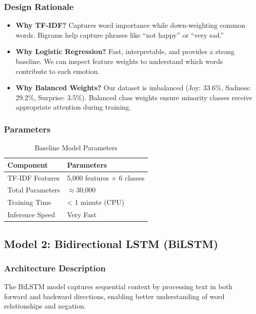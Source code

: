 \documentclass[12pt,a4paper]{article}
\begin{document}
\subsubsection{Design Rationale}
\begin{itemize}
    \item \textbf{Why TF-IDF?} Captures word importance while down-weighting common words. Bigrams help capture phrases like ``not happy'' or ``very sad.''
    
    \item \textbf{Why Logistic Regression?} Fast, interpretable, and provides a strong baseline. We can inspect feature weights to understand which words contribute to each emotion.
    
    \item \textbf{Why Balanced Weights?} Our dataset is imbalanced (Joy: 33.6\%, Sadness: 29.2\%, Surprise: 3.5\%). Balanced class weights ensure minority classes receive appropriate attention during training.
\end{itemize}

\subsubsection{Parameters}
\begin{table}[H]
\centering
\begin{tabular}{@{}ll@{}}
\toprule
\textbf{Component} & \textbf{Parameters} \\ \midrule
TF-IDF Features & 5,000 features × 6 classes \\
Total Parameters & $\approx$30,000 \\
Training Time & < 1 minute (CPU) \\
Inference Speed & Very Fast \\ \bottomrule
\end{tabular}
\caption{Baseline Model Parameters}
\label{tab:baseline_params}
\end{table}

\subsection{Model 2: Bidirectional LSTM (BiLSTM)}

\subsubsection{Architecture Description}
The BiLSTM model captures sequential context by processing text in both forward and backward directions, enabling better understanding of word relationships and negation.
\end{document}
